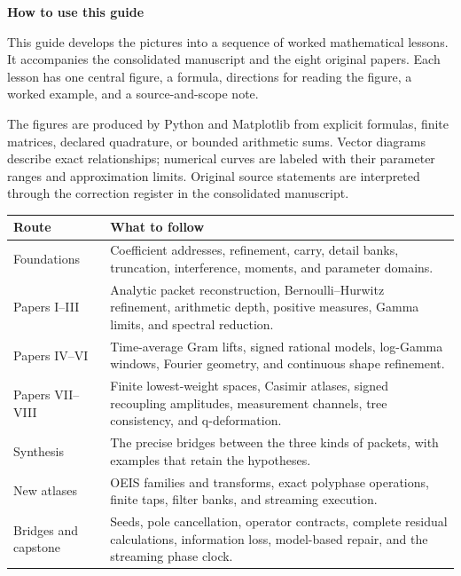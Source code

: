 \documentclass[11pt]{article}
\begin{document}
\KomorebiCover

\hypersetup{pageanchor=false}

\hypersetup{pageanchor=true}
{\LARGE\bfseries How to use this guide\par}
\vspace{0.2in}
This guide develops the pictures into a sequence of worked mathematical lessons. It accompanies the consolidated manuscript and the eight original papers. Each lesson has one central figure, a formula, directions for reading the figure, a worked example, and a source-and-scope note.

The figures are produced by Python and Matplotlib from explicit formulas, finite matrices, declared quadrature, or bounded arithmetic sums. Vector diagrams describe exact relationships; numerical curves are labeled with their parameter ranges and approximation limits. Original source statements are interpreted through the correction register in the consolidated manuscript.

\vspace{0.1in}
\begin{tabular}{>{\raggedright\arraybackslash}p{1.25in}>{\raggedright\arraybackslash}p{5.1in}}
\toprule
Route & What to follow\\
\midrule
Foundations & Coefficient addresses, refinement, carry, detail banks, truncation, interference, moments, and parameter domains.\\[0.09in]
Papers I--III & Analytic packet reconstruction, Bernoulli--Hurwitz refinement, arithmetic depth, positive measures, Gamma limits, and spectral reduction.\\[0.09in]
Papers IV--VI & Time-average Gram lifts, signed rational models, log-Gamma windows, Fourier geometry, and continuous shape refinement.\\[0.09in]
Papers VII--VIII & Finite lowest-weight spaces, Casimir atlases, signed recoupling amplitudes, measurement channels, tree consistency, and q-deformation.\\[0.09in]
Synthesis & The precise bridges between the three kinds of packets, with examples that retain the hypotheses.\\[0.09in]
New atlases & OEIS families and transforms, exact polyphase operations, finite taps, filter banks, and streaming execution.\\[0.09in]
Bridges and capstone & Seeds, pole cancellation, operator contracts, complete residual calculations, information loss, model-based repair, and the streaming phase clock.\\
\bottomrule
\end{tabular}\par
\end{document}
